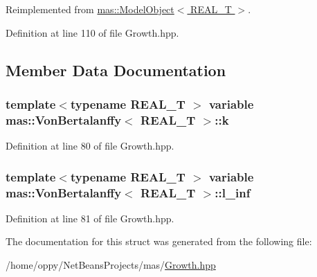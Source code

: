 Reimplemented from \hyperlink{structmas_1_1_model_object_a8eaf6c7c52e42ea8869aefa318358cb5}{mas\-::\-Model\-Object$<$ R\-E\-A\-L\-\_\-\-T $>$}.



Definition at line 110 of file Growth.\-hpp.



\subsection{Member Data Documentation}
\hypertarget{structmas_1_1_von_bertalanffy_a6478a55daec32dd2e49104bda9207586}{
\subsubsection[{k}]{\setlength{\rightskip}{0pt plus 5cm}template$<$typename R\-E\-A\-L\-\_\-\-T $>$ {\bf variable} {\bf mas\-::\-Von\-Bertalanffy}$<$ R\-E\-A\-L\-\_\-\-T $>$\-::k}}\label{structmas_1_1_von_bertalanffy_a6478a55daec32dd2e49104bda9207586}


Definition at line 80 of file Growth.\-hpp.

\hypertarget{structmas_1_1_von_bertalanffy_a1c1c468cf32d014d16dcf8d9defccc46}{
\subsubsection[{l\-\_\-inf}]{\setlength{\rightskip}{0pt plus 5cm}template$<$typename R\-E\-A\-L\-\_\-\-T $>$ {\bf variable} {\bf mas\-::\-Von\-Bertalanffy}$<$ R\-E\-A\-L\-\_\-\-T $>$\-::l\-\_\-inf}}\label{structmas_1_1_von_bertalanffy_a1c1c468cf32d014d16dcf8d9defccc46}


Definition at line 81 of file Growth.\-hpp.



The documentation for this struct was generated from the following file\-:\begin{DoxyCompactItemize}
\item 
/home/oppy/\-Net\-Beans\-Projects/mas/\hyperlink{_growth_8hpp}{Growth.\-hpp}\end{DoxyCompactItemize}
